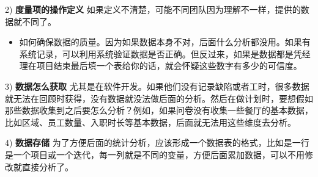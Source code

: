 2) \textbf{度量项的操作定义}
如果定义不清楚，可能不同团队因为理解不一样，提供的数据就不同了。

\begin{itemize}
\tightlist
\item
  如何确保数据的质量。因为如果数据本身不对，后面什么分析都没用。如果有系统记录，可以利用系统验证数据是否正确。但反过来，如果是数据都是凭经理在项目结束最后填一个表给你的话，就会怀疑这些数字有多少的可信度。
\end{itemize}

3) \textbf{数据怎么获取}
尤其是在软件开发。如果他们没有记录缺陷或者工时，很多数据就无法在回顾时获得，没有数据就没法做后面的分析。然后在做计划时，要想假如那些数据收集到之后要怎么分析？例如，如果问卷没有收集一些餐厅的基本数据，比如区域、员工数量、入职时长等基本数据，后面就无法用这些维度去分析。

4) \textbf{数据存储}
为了方便后面的统计分析，应该形成一个数据表的格式，比如是一行是一个项目或一个迭代，每一列就是不同的变量，方便后面累加数据，可以不用修改就直接分析了。






